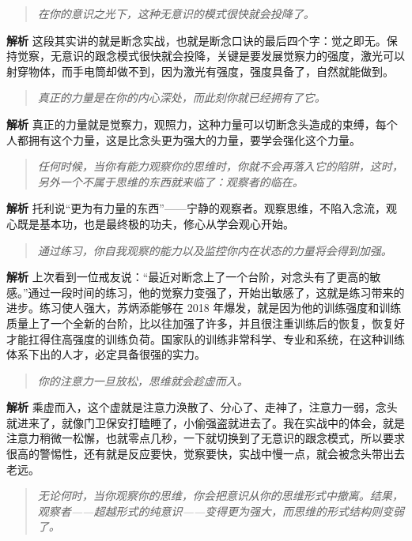 \begin{quote}\it
    在你的意识之光下，这种无意识的模式很快就会投降了。
\end{quote}

\textbf{解析} 这段其实讲的就是断念实战，也就是断念口诀的最后四个字：觉之即无。保持觉察，无意识的跟念模式很快就会投降，关键是要发展觉察力的强度，激光可以射穿物体，而手电筒却做不到，因为激光有强度，强度具备了，自然就能做到。

\begin{quote}\it
    真正的力量是在你的内心深处，而此刻你就已经拥有了它。
\end{quote}

\textbf{解析} 真正的力量就是觉察力，观照力，这种力量可以切断念头造成的束缚，每个人都拥有这个力量，这是比念头更为强大的力量，要学会强化这个力量。

\begin{quote}\it
    任何时候，当你有能力观察你的思维时，你就不会再落入它的陷阱，这时，另外一个不属于思维的东西就来临了：观察者的临在。
\end{quote}

\textbf{解析} 托利说“更为有力量的东西”——宁静的观察者。观察思维，不陷入念流，观心既是基本功，也是最终极的功夫，修心从学会观心开始。

\begin{quote}\it
    通过练习，你自我观察的能力以及监控你内在状态的力量将会得到加强。
\end{quote}

\textbf{解析} 上次看到一位戒友说：“最近对断念上了一个台阶，对念头有了更高的敏感。”通过一段时间的练习，他的觉察力变强了，开始出敏感了，这就是练习带来的进步。练习使人强大，苏炳添能够在 2018 年爆发，就是因为他的训练强度和训练质量上了一个全新的台阶，比以往加强了许多，并且很注重训练后的恢复，恢复好才能扛得住高强度的训练负荷。国家队的训练非常科学、专业和系统，在这种训练体系下出的人才，必定具备很强的实力。

\begin{quote}\it
    你的注意力一旦放松，思维就会趁虚而入。
\end{quote}

\textbf{解析} 乘虚而入，这个虚就是注意力涣散了、分心了、走神了，注意力一弱，念头就进来了，就像门卫保安打瞌睡了，小偷强盗就进去了。我在实战中的体会，就是注意力稍微一松懈，也就零点几秒，一下就切换到了无意识的跟念模式，所以要求很高的警惕性，还有就是反应要快，觉察要快，实战中慢一点，就会被念头带出去老远。

\begin{quote}\it
    无论何时，当你观察你的思维，你会把意识从你的思维形式中撤离。结果，观察者——超越形式的纯意识——变得更为强大，而思维的形式结构则变弱了。
\end{quote}

